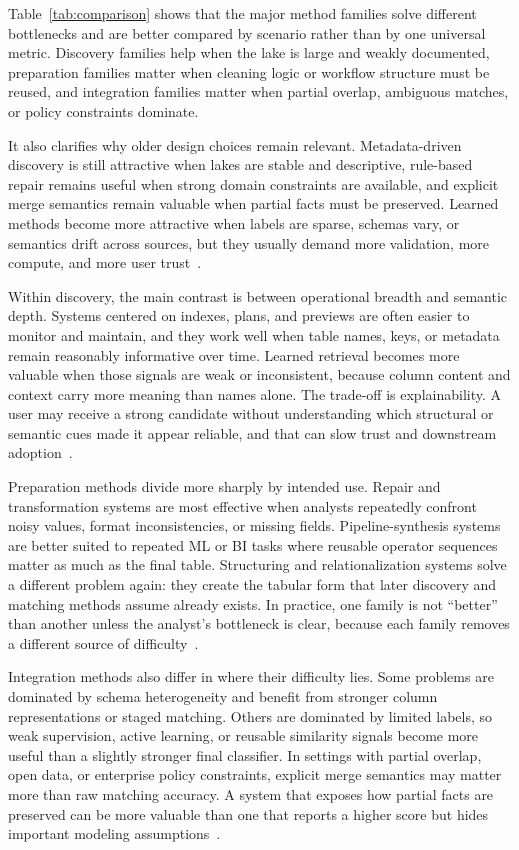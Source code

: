 \documentclass[sigconf]{acmart}
\begin{document}
Table~\ref{tab:comparison} shows that the major method families solve different bottlenecks and are better compared by scenario rather than by one universal metric. Discovery families help when the lake is large and weakly documented, preparation families matter when cleaning logic or workflow structure must be reused, and integration families matter when partial overlap, ambiguous matches, or policy constraints dominate.

It also clarifies why older design choices remain relevant. Metadata-driven discovery is still attractive when lakes are stable and descriptive, rule-based repair remains useful when strong domain constraints are available, and explicit merge semantics remain valuable when partial facts must be preserved. Learned methods become more attractive when labels are sparse, schemas vary, or semantics drift across sources, but they usually demand more validation, more compute, and more user trust~\cite{10.14778/3587136.3587146,10.14778/3675034.3675051,10.14778/3742728.3742757}.

Within discovery, the main contrast is between operational breadth and semantic depth. Systems centered on indexes, plans, and previews are often easier to monitor and maintain, and they work well when table names, keys, or metadata remain reasonably informative over time. Learned retrieval becomes more valuable when those signals are weak or inconsistent, because column content and context carry more meaning than names alone. The trade-off is explainability. A user may receive a strong candidate without understanding which structural or semantic cues made it appear reliable, and that can slow trust and downstream adoption~\cite{10.14778/3685800.3685880,10.14778/3587136.3587146}.

Preparation methods divide more sharply by intended use. Repair and transformation systems are most effective when analysts repeatedly confront noisy values, format inconsistencies, or missing fields. Pipeline-synthesis systems are better suited to repeated ML or BI tasks where reusable operator sequences matter as much as the final table. Structuring and relationalization systems solve a different problem again: they create the tabular form that later discovery and matching methods assume already exists. In practice, one family is not ``better'' than another unless the analyst's bottleneck is clear, because each family removes a different source of difficulty~\cite{10.14778/3675034.3675051,10.1145/3698831,10.1145/3665252.3665269}.

Integration methods also differ in where their difficulty lies. Some problems are dominated by schema heterogeneity and benefit from stronger column representations or staged matching. Others are dominated by limited labels, so weak supervision, active learning, or reusable similarity signals become more useful than a slightly stronger final classifier. In settings with partial overlap, open data, or enterprise policy constraints, explicit merge semantics may matter more than raw matching accuracy. A system that exposes how partial facts are preserved can be more valuable than one that reports a higher score but hides important modeling assumptions~\cite{10.1145/3555041.3589732,10.1145/3588712,10.1145/3626711}.
\end{document}
